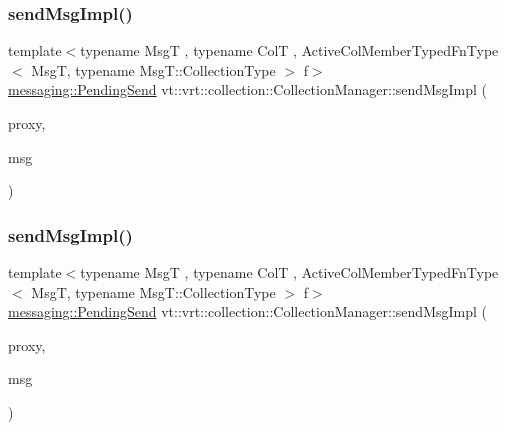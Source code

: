 \mbox{\label{structvt_1_1vrt_1_1collection_1_1_collection_manager_afc14691c6992cc5d7e51118b1386b67c}} 
\subsubsection{\texorpdfstring{send\+Msg\+Impl()}{sendMsgImpl()}\hspace{0.1cm}{\footnotesize\ttfamily [1/2]}}
{\footnotesize\ttfamily template$<$typename MsgT , typename ColT , Active\+Col\+Member\+Typed\+Fn\+Type$<$ Msg\+T, typename Msg\+T\+::\+Collection\+Type $>$ f$>$ \\
\hyperlink{structvt_1_1messaging_1_1_pending_send}{messaging\+::\+Pending\+Send} vt\+::vrt\+::collection\+::\+Collection\+Manager\+::send\+Msg\+Impl (\begin{DoxyParamCaption}\item[{\hyperlink{namespacevt_1_1vrt_a620a5c8c59d13e513f690c74b4af516f}{Virtual\+Elm\+Proxy\+Type}$<$ ColT $>$ const \&}]{proxy,  }\item[{MsgT $\ast$}]{msg }\end{DoxyParamCaption})}

\mbox{\label{structvt_1_1vrt_1_1collection_1_1_collection_manager_afc14691c6992cc5d7e51118b1386b67c}} 
\subsubsection{\texorpdfstring{send\+Msg\+Impl()}{sendMsgImpl()}\hspace{0.1cm}{\footnotesize\ttfamily [2/2]}}
{\footnotesize\ttfamily template$<$typename MsgT , typename ColT , Active\+Col\+Member\+Typed\+Fn\+Type$<$ Msg\+T, typename Msg\+T\+::\+Collection\+Type $>$ f$>$ \\
\hyperlink{structvt_1_1messaging_1_1_pending_send}{messaging\+::\+Pending\+Send} vt\+::vrt\+::collection\+::\+Collection\+Manager\+::send\+Msg\+Impl (\begin{DoxyParamCaption}\item[{\hyperlink{namespacevt_1_1vrt_a620a5c8c59d13e513f690c74b4af516f}{Virtual\+Elm\+Proxy\+Type}$<$ ColT $>$ const \&}]{proxy,  }\item[{MsgT $\ast$}]{msg }\end{DoxyParamCaption})}

